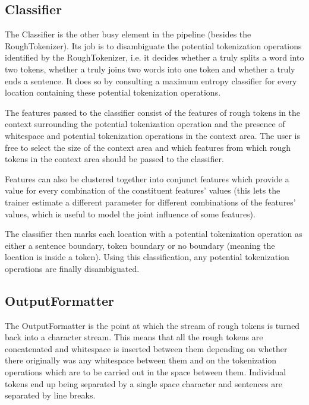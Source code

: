 \subsection{Classifier}

The Classifier is the other busy element in the pipeline (besides the
RoughTokenizer). Its job is to disambiguate the potential tokenization
operations identified by the RoughTokenizer, i.e. it decides whether a
\maysplit{} truly splits a word into two tokens, whether a \mayjoin{}
truly joins two words into one token and whether a \maybreaksentence{}
truly ends a sentence. It does so by consulting a maximum entropy
classifier for every location containing these potential tokenization
operations.

The features passed to the classifier consist of the features of rough
tokens in the context surrounding the potential tokenization operation
and the presence of whitespace and potential tokenization operations
in the context area. The user is free to select the size of the
context area and which features from which rough tokens in the context
area should be passed to the classifier.

Features can also be clustered together into conjunct features which
provide a value for every combination of the constituent features'
values (this lets the trainer estimate a different parameter for
different combinations of the features' values, which is useful to
model the joint influence of some features).

The classifier then marks each location with a potential tokenization
operation as either a sentence boundary, token boundary or no boundary
(meaning the location is inside a token). Using this classification,
any potential tokenization operations are finally disambiguated.

\subsection{OutputFormatter}

The OutputFormatter is the point at which the stream of rough tokens
is turned back into a character stream. This means that all the rough
tokens are concatenated and whitespace is inserted between them
depending on whether there originally was any whitespace between them
and on the tokenization operations which are to be carried out in the
space between them. Individual tokens end up being separated by a
single space character and sentences are separated by line breaks.
